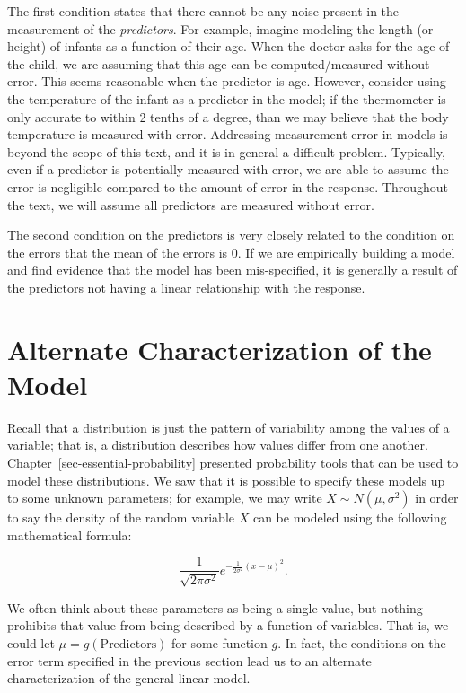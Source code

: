 \documentclass[
  letterpaper,
  DIV=11,
  numbers=noendperiod]{scrreprt}
\theoremstyle{definition}
\theoremstyle{definition}
\theoremstyle{remark}
\begin{document}
The first condition states that there cannot be any noise present in the
measurement of the \emph{predictors}. For example, imagine modeling the
length (or height) of infants as a function of their age. When the
doctor asks for the age of the child, we are assuming that this age can
be computed/measured without error. This seems reasonable when the
predictor is age. However, consider using the temperature of the infant
as a predictor in the model; if the thermometer is only accurate to
within 2 tenths of a degree, than we may believe that the body
temperature is measured with error. Addressing measurement error in
models is beyond the scope of this text, and it is in general a
difficult problem. Typically, even if a predictor is potentially
measured with error, we are able to assume the error is negligible
compared to the amount of error in the response. Throughout the text, we
will assume all predictors are measured without error.

The second condition on the predictors is very closely related to the
condition on the errors that the mean of the errors is 0. If we are
empirically building a model and find evidence that the model has been
mis-specified, it is generally a result of the predictors not having a
linear relationship with the response.

\hypertarget{alternate-characterization-of-the-model}{%
\section{Alternate Characterization of the
Model}\label{alternate-characterization-of-the-model}}

Recall that a distribution is just the pattern of variability among the
values of a variable; that is, a distribution describes how values
differ from one another. Chapter~\ref{sec-essential-probability}
presented probability tools that can be used to model these
distributions. We saw that it is possible to specify these models up to
some unknown parameters; for example, we may write
\(X \sim N\left(\mu, \sigma^2\right)\) in order to say the density of
the random variable \(X\) can be modeled using the following
mathematical formula:

\[\frac{1}{\sqrt{2\pi\sigma^2}} e^{-\frac{1}{2\sigma^2}\left(x - \mu\right)^2}.\]

We often think about these parameters as being a single value, but
nothing prohibits that value from being described by a function of
variables. That is, we could let \(\mu = g(\text{Predictors})\) for some
function \(g\). In fact, the conditions on the error term specified in
the previous section lead us to an alternate characterization of the
general linear model.
\end{document}
